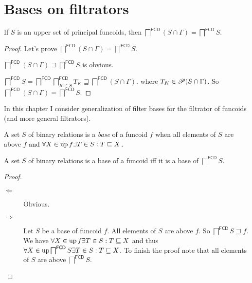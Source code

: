 \chapter{Bases on filtrators}

\begin{lem}
If $S$ is an upper set of principal funcoids, then
$\bigsqcap^{\mathsf{FCD}} (S\cap\Gamma)=\bigsqcap^{\mathsf{FCD}} S$.
\end{lem}

\begin{proof}
  Let's prove $\bigsqcap^{\mathsf{FCD}} (S\cap\Gamma) = \bigsqcap^{\mathsf{FCD}} S$.
  
  $\bigsqcap^{\mathsf{FCD}} (S\cap\Gamma) \sqsupseteq \bigsqcap^{\mathsf{FCD}} S$ is obvious.
  
  $\bigsqcap^{\mathsf{FCD}} S = \bigsqcap^{\mathsf{FCD}} \bigsqcap^{\mathsf{FCD}}_{K\in S} T_K \sqsupseteq \bigsqcap^{\mathsf{FCD}} (S\cap\Gamma)$.
  where $T_K\in\mathscr{P} (S\cap\Gamma)$.
  So $\bigsqcap^{\mathsf{FCD}} (S\cap\Gamma) = \bigsqcap^{\mathsf{FCD}} S$.
\end{proof}

In this chapter I consider generalization of filter bases
for the filtrator of funcoids (and more general filtrators).


\begin{defn}
  A set $S$ of binary relations is a \emph{base} of a funcoid $f$ when all elements
  of $S$ are above $f$ and $\forall X \in \operatorname{up} f \exists T \in S : T
  \sqsubseteq X$.
\end{defn}

\begin{prop}
  A set $S$ of binary relations is a base of a funcoid iff it is a base of
  $\bigsqcap^{\mathsf{FCD}} S$.
\end{prop}

\begin{proof}
  ~
  \begin{description}
    \item[$\Leftarrow$] Obvious.
    
    \item[$\Rightarrow$] Let $S$ be a base of funcoid $f$. All elements of $S$
    are above $f$. So $\bigsqcap^{\mathsf{FCD}} S \sqsupseteq f$. We
    have $\forall X \in \operatorname{up} f \exists T \in S : T \sqsubseteq X$ and
    thus $\forall X \in \operatorname{up} \bigsqcap^{\mathsf{FCD}} S \exists T
    \in S : T \sqsubseteq X$. To finish the proof note that all elements of
    $S$ are above $\bigsqcap^{\mathsf{FCD}} S$.
  \end{description}
\end{proof}

